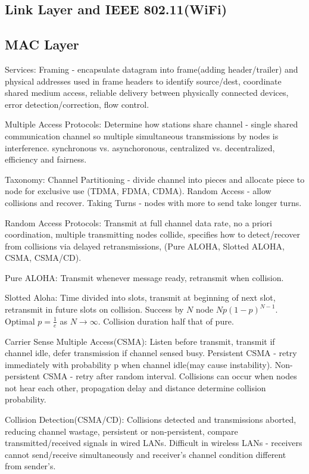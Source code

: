 \documentclass[8pt]{extarticle}
\begin{document}
\begin{multicols}{2}
\section{Link Layer and IEEE 802.11(WiFi)}

\subsection{MAC Layer}

Services: Framing - encapsulate datagram into frame(adding header/trailer) and physical addresses used in frame headers to identify source/dest, coordinate shared medium access, reliable delivery between physically
connected devices, error detection/correction, flow control.

Multiple Access Protocols: Determine how stations share channel - single shared communication channel so multiple simultaneous transmissions by nodes is interference. synchronous vs. asynchoronous, centralized vs. decentralized, efficiency and fairness.

Taxonomy: Channel Partitioning - divide channel into pieces and allocate piece to node for exclusive use (TDMA, FDMA, CDMA). Random Access - allow collisions and recover. Taking Turns - nodes with more to send take longer turns.

Random Access Protocols: Transmit at full channel data rate, no a priori coordination, multiple transmitting nodes collide, specifies how to detect/recover from collisions via delayed retransmissions, (Pure ALOHA, Slotted ALOHA, CSMA, CSMA/CD).

Pure ALOHA: Transmit whenever  message ready, retransmit when collision.

Slotted Aloha: Time divided into slots, transmit at beginning of next slot, retransmit in future slots on collision. Success by $N$ node $Np(1-p)^{N-1}$. Optimal $p=\frac{1}{e}$ as $N\rightarrow{\infty}$. Collision duration half that of pure.

Carrier Sense Multiple Access(CSMA): Listen before transmit, transmit if channel idle, defer transmission if channel sensed busy. Persistent CSMA - retry immediately with probability p when channel idle(may cause instability). Non-persistent CSMA - retry after random interval. Collisions can occur when nodes not hear each other, propagation delay and distance determine collision probability.

Collision Detection(CSMA/CD): Collisions detected and transmissions aborted, reducing channel
wastage, persistent or non-persistent, compare transmitted/received signals in wired LANs. Difficult in wireless LANs -  receivers cannot send/receive simultaneously and receiver’s channel condition different from sender's.


\end{multicols}
\end{document}
